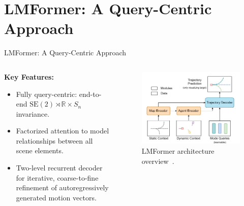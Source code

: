\documentclass[10pt,aspectratio=169]{beamer}
\begin{document}
\section{LMFormer: A Query-Centric Approach}

\begin{frame}{LMFormer: A Query-Centric Approach}
    \begin{columns}[T]
        \begin{column}{0.5\textwidth}
            \textbf{Key Features:}
            \begin{itemize}
                \item Fully query-centric: end-to-end \(\mathrm{SE}(2) \rtimes \mathbb{R} \times S_n\) invariance.
                \item Factorized attention to model relationships between all scene elements.
                \item Two-level recurrent decoder for iterative, coarse-to-fine refinement of autoregressively generated motion vectors.
            \end{itemize}
        \end{column}
        \begin{column}{0.5\textwidth}
            \begin{figure}
                \includegraphics[width=\textwidth]{docs/figures/lmformer_arch.png}
                \caption{LMFormer architecture overview~\cite{lmformerYadav2025}.}
            \end{figure}
        \end{column}
    \end{columns}
\end{frame}
\end{document}
